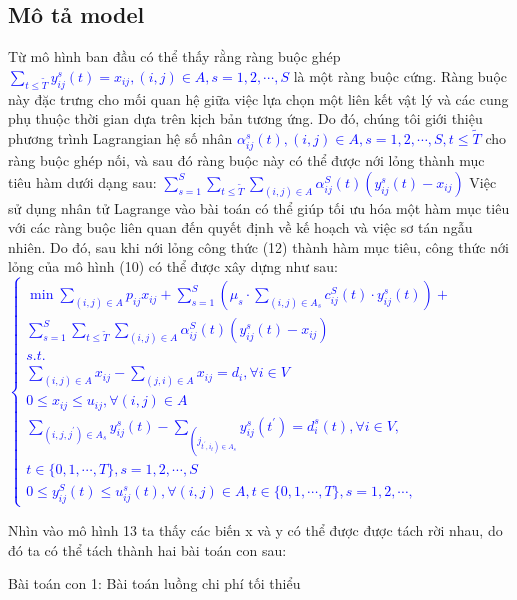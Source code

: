 \documentclass[a4paper]{article}
\begin{document}
\subsection{Mô tả model}
Từ mô hình ban đầu có thể thấy rằng ràng buộc ghép \textcolor{blue}{$\sum_{t \leqslant \widetilde{T}} y_{i j}^s(t)=x_{i j},(i, j) \in A, s=1,2, \cdots, S$}
là một ràng buộc cứng. Ràng buộc này đặc trưng cho mối quan hệ giữa việc lựa chọn một liên kết vật lý và các cung phụ thuộc thời gian dựa trên kịch bản tương ứng. Do đó, chúng tôi giới thiệu phương trình Lagrangian hệ số nhân \textcolor{blue}{$\alpha_{i j}^s(t),(i, j) \in A, s=1,2, \cdots, S, t \leqslant \widetilde{T}$} cho ràng buộc ghép nối, và sau đó ràng buộc này có thể được nới lỏng thành mục tiêu hàm dưới dạng sau: 
\textcolor{blue}{$\sum_{s=1}^S \sum_{t \leqslant \widetilde{T}} \sum_{(i, j) \in A} \alpha_{i j}^S(t)\left(y_{i j}^s(t)-x_{i j}\right)$}
Việc sử dụng nhân tử Lagrange vào bài toán có thể giúp tối ưu hóa một hàm mục tiêu với các ràng buộc liên quan đến quyết định về kế hoạch và việc sơ tán ngẫu nhiên. Do đó, sau khi nới lỏng công thức (12) thành hàm mục tiêu, công thức nới lỏng của mô hình (10) có thể được xây dựng như sau: 
\textcolor{blue}{$\left\{\begin{array}{l}\min \sum_{(i, j) \in A} p_{i j} x_{i j}+\sum_{s=1}^S\left(\mu_s \cdot \sum_{(i, j) \in A_s} c_{i j}^S(t) \cdot y_{i j}^s(t)\right)+ \\ \sum_{s=1}^S \sum_{t \leqslant \tilde{T}} \sum_{(i, j) \in A} \alpha_{i j}^S(t)\left(y_{i j}^s(t)-x_{i j}\right) \\ s . t . \\ \sum_{(i, j) \in A} x_{i j}-\sum_{(j, i) \in A} x_{i j}=d_i, \forall i \in V \\ 0 \leqslant x_{i j} \leqslant u_{i j}, \forall(i, j) \in A \\ \sum_{\left(i, j, j^{\prime}\right) \in A_s} y_{i j}^s(t)-\sum_{\left(j_{\left.t^{\prime}, i_t\right) \in A_s}\right.} y_{i j}^s\left(t^{\prime}\right)=d_i^s(t), \forall i \in V, \\ t \in\{0,1, \cdots, T\}, s=1,2, \cdots, S \\ 0 \leqslant y_{i j}^S(t) \leqslant u_{i j}^s(t), \forall(i, j) \in A, t \in\{0,1, \cdots, T\}, s=1,2, \cdots,\end{array}\right.$}

Nhìn vào mô hình 13 ta thấy các biến x và y có thể được được tách rời nhau, do đó ta có thể tách thành hai bài toán con sau: 

Bài toán con 1: Bài toán luồng chi phí tối thiểu  
\end{document}
